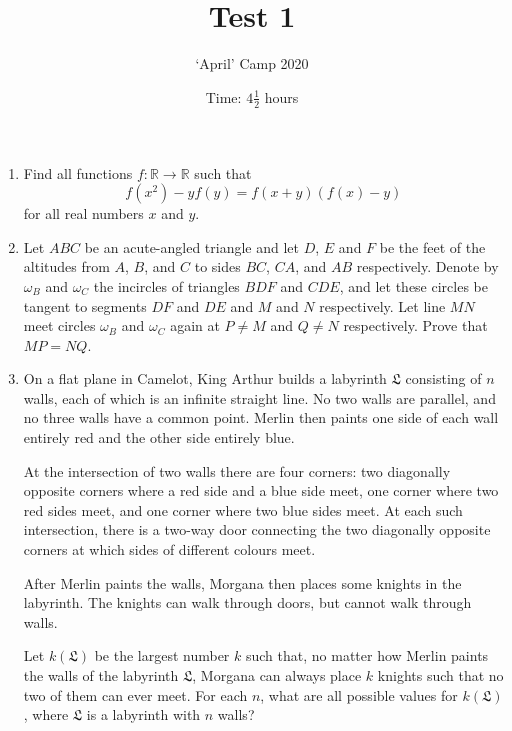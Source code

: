 \documentclass{article}
\title{Test 1}
\author{`April' Camp 2020}
\date{Time: $4\frac{1}{2}$ hours}
\begin{document}
\maketitle
\thispagestyle{empty}


\begin{enumerate}[1.]

\vfill
\item %
Find all functions $f : \mathbb{R} \to \mathbb{R}$ such that
\[ f(x^2) -yf(y) = f(x+y)(f(x)-y) \]
for all real numbers $x$ and $y$.


\vfill
\item %
Let $ABC$ be an acute-angled triangle and let $D$, $E$ and $F$ be the feet of the altitudes from $A$, $B$, and $C$ to sides $BC$, $CA$, and $AB$ respectively.
Denote by $\omega_B$ and $\omega_C$ the incircles of triangles $BDF$ and $CDE$, and let these circles be tangent to segments $DF$ and $DE$ and $M$ and $N$ respectively.
Let line $MN$ meet circles $\omega_B$ and $\omega_C$ again at $P \neq M$ and $Q \neq N$ respectively.
Prove that $MP = NQ$.


\vfill
\item %
\newcommand{\LL}{\mathfrak{L}}
On a flat plane in Camelot, King Arthur builds a labyrinth $\LL$ consisting of $n$ walls, each of which is an infinite straight line.
No two walls are parallel, and no three walls have a common point.
Merlin then paints one side of each wall entirely red and the other side entirely blue.

At the intersection of two walls there are four corners: two diagonally opposite corners where a red side and a blue side meet, one corner where two red sides meet, and one corner where two blue sides meet.
At each such intersection, there is a two-way door connecting the two diagonally opposite corners at which sides of different colours meet.

After Merlin paints the walls, Morgana then places some knights in the labyrinth.
The knights can walk through doors, but cannot walk through walls.

Let $k(\LL)$ be the largest number $k$ such that, no matter how Merlin paints the walls of the labyrinth $\LL$, Morgana can always place $k$ knights such that no two of them can ever meet.
For each $n$, what are all possible values for $k(\LL)$, where $\LL$ is a labyrinth with $n$ walls?

\vfill
\end{enumerate}


\vfill
\centering
\begin{BVerbatim}
\end{BVerbatim}
\end{document}
